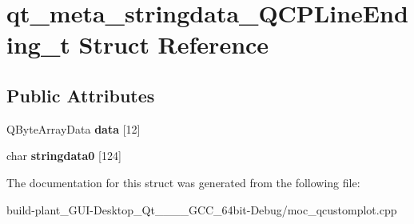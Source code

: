 \hypertarget{structqt__meta__stringdata__QCPLineEnding__t}{}\section{qt\+\_\+meta\+\_\+stringdata\+\_\+\+Q\+C\+P\+Line\+Ending\+\_\+t Struct Reference}
\label{structqt__meta__stringdata__QCPLineEnding__t}
\subsection*{Public Attributes}
\begin{DoxyCompactItemize}
\item 
\mbox{\label{structqt__meta__stringdata__QCPLineEnding__t_afd1b8860d3c0d66e6e4abf54197c47e6}} 
Q\+Byte\+Array\+Data {\bfseries data} \mbox{[}12\mbox{]}
\item 
\mbox{\label{structqt__meta__stringdata__QCPLineEnding__t_a20c616613071fe30d8f5bcf67c6851b2}} 
char {\bfseries stringdata0} \mbox{[}124\mbox{]}
\end{DoxyCompactItemize}


The documentation for this struct was generated from the following file\+:\begin{DoxyCompactItemize}
\item 
build-\/plant\+\_\+\+G\+U\+I-\/\+Desktop\+\_\+\+Qt\+\_\+\_\+\_\+\_\+\+G\+C\+C\+\_\+64bit-\/\+Debug/moc\+\_\+qcustomplot.\+cpp\end{DoxyCompactItemize}
